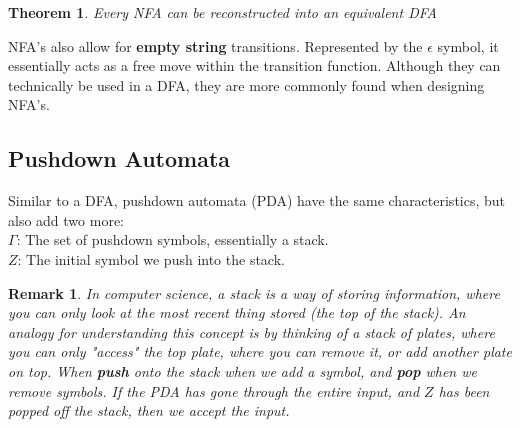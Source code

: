 \documentclass[12pt, letterpaper]{article}
\newtheorem{thm}{Theorem}[section]
\newtheorem*{rem}{Remark}
\begin{document}
\begin{thm}
Every NFA can be reconstructed into an equivalent DFA
\end{thm}

NFA's also allow for \textbf{empty string} transitions. Represented by the $\epsilon$ symbol, it essentially acts as a free move within the transition function. Although they can technically be used in a DFA, they are more commonly found when designing NFA's.

\subsection{Pushdown Automata}
Similar to a DFA, pushdown automata (PDA) have the same characteristics, but also add two more:\\
$\Gamma$: The set of pushdown symbols, essentially a stack.\\
$Z$: The initial symbol we push into the stack.\\
\begin{rem}
In computer science, a stack is a way of storing information, where you can only look at the most recent thing stored (the top of the stack). An analogy for understanding this concept is by thinking of a stack of plates, where you can only "access" the top plate, where you can remove it, or add another plate on top. When \textbf{push} onto the stack when we add a symbol, and \textbf{pop} when we remove symbols. If the PDA has gone through the entire input, and $Z$ has been popped off the stack, then we accept the input.
\end{rem}
\end{document}

